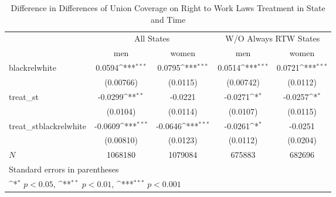 \begin{table}[htbp]\centering
\def\sym#1{\ifmmode^{#1}\else\(^{#1}\)\fi}
\caption{Difference in Differences of Union Coverage on Right to Work Laws Treatment in State and Time}
\begin{tabular}{l*{4}{c}}
\hline\hline
            &\multicolumn{2}{c}{All States}             &\multicolumn{2}{c}{W/O Always RTW States}  \\\cmidrule(lr){2-3}\cmidrule(lr){4-5}
            &\multicolumn{1}{c}{men}&\multicolumn{1}{c}{women}&\multicolumn{1}{c}{men}&\multicolumn{1}{c}{women}\\
\hline
blackrelwhite&      0.0594\sym{***}&      0.0795\sym{***}&      0.0514\sym{***}&      0.0721\sym{***}\\
            &   (0.00766)         &    (0.0115)         &   (0.00742)         &    (0.0112)         \\
[1em]
treat\_st    &     -0.0299\sym{**} &     -0.0221         &     -0.0271\sym{*}  &     -0.0257\sym{*}  \\
            &    (0.0104)         &    (0.0114)         &    (0.0107)         &    (0.0115)         \\
[1em]
treat\_stblackrelwhite&     -0.0609\sym{***}&     -0.0646\sym{***}&     -0.0261\sym{*}  &     -0.0251         \\
            &   (0.00810)         &    (0.0123)         &    (0.0112)         &    (0.0204)         \\
\hline
\(N\)       &     1068180         &     1079084         &      675883         &      682696         \\
\hline\hline
\multicolumn{5}{l}{\footnotesize Standard errors in parentheses}\\
\multicolumn{5}{l}{\footnotesize \sym{*} \(p<0.05\), \sym{**} \(p<0.01\), \sym{***} \(p<0.001\)}\\
\end{tabular}
\end{table}
